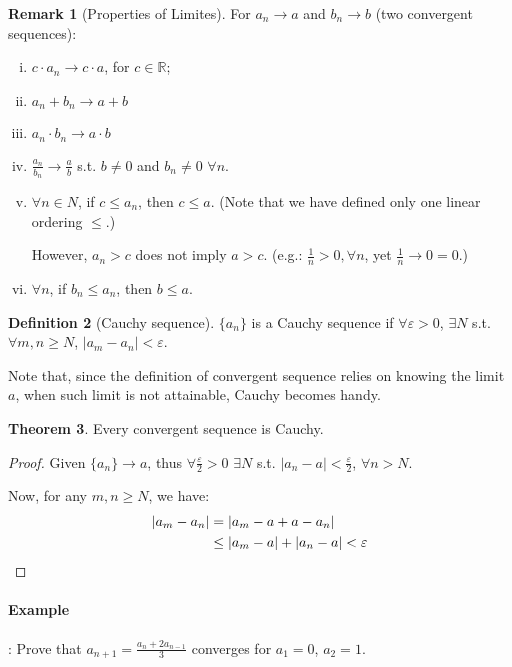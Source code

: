 \documentclass[12pt]{article}
\newcommand{\R}{{\mathbb R}}
\theoremstyle{definition}
\newtheorem{theorem}{Theorem}[section]
\newtheorem{definition}[theorem]{Definition}
\newtheorem{remark}[theorem]{Remark}
\theoremstyle{plain}
\begin{document}
\begin{remark}
    [Properties of Limites]
    For $a_n \to a$ and $b_n \to b$ (two convergent sequences):
    \begin{enumerate}[(i)]
        \item $c \cdot a_n \to c\cdot a$, for $c \in \R$;
        \item $a_n + b_n \to a + b$
        \item $a_n \cdot b_n \to a\cdot b$
        \item $\frac{a_n}{b_n} \to \frac{a}{b}$ s.t. $b \not = 0$ and $b_n \not= 
            0$ $\forall n$.
        \item $\forall n \in N$, if  $c \le a_n$, then $c \le a$. (Note that we have 
            defined only one linear ordering $\le$.)

            However, $a_n > c$ does not imply $a > c$. (e.g.: 
            $\frac{1}{n} > 0, \forall n$, yet $\frac{1}{n}\to 0 = 0$.)

        \item $\forall n$, if $b_n \le a_n$, then $b\le a$.
    \end{enumerate}    
\end{remark}

\begin{definition}
    [Cauchy sequence]

    $\{a_n\}$ is a Cauchy sequence if $\forall \varepsilon> 0$, $\exists N$ s.t. 
    $\forall m , n \ge N$, $|a_m-a_n| < \varepsilon$.
\end{definition}

Note that, since the definition of convergent sequence relies on knowing the 
limit $a$, when such limit is not attainable, Cauchy becomes handy.

\begin{theorem}
    Every convergent sequence is Cauchy.
    \begin{proof}
        Given $\{a _n\} \to a$, thus $\forall \frac{\varepsilon}{2} > 
        0$ $\exists N$ s.t. $|a_n - a| < \frac{\varepsilon}{2}$, $\forall n > 
        N$.

        Now, for any $m, n \ge N$, we have: 
        \[
            \aligned
            |a_m - a_n| & = | a_m - a + a - a_n|\\
            & \le |a_m - a| + |a_n - a| < \varepsilon
            \endaligned
        \]
    \end{proof}
\end{theorem}

\paragraph{Example}: 
Prove that $a_{n+1} = \frac{a_n + 2a_{n-1}}{3}$ converges for $a_1 = 0$, $a_2 = 1$.
\end{document}

